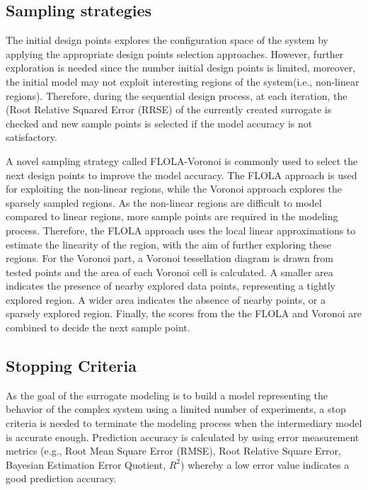  \subsection{Sampling strategies}
 
The initial design points explores the configuration space of the system by applying the appropriate design points selection approaches. However, further exploration is needed since the number initial design points is limited, moreover, the initial model may not exploit interesting regions of the system(i.e., non-linear regions).  Therefore, during the sequential design process, at each iteration, the (Root Relative Squared Error (RRSE)  of the currently created surrogate is checked and new sample points is selected if the model accuracy is not satisfactory. 
 
A novel sampling strategy called FLOLA-Voronoi \cite{vanderherten2015} is commonly used to select the next design points to improve the model accuracy.  The FLOLA approach is used for exploiting the non-linear regions, while the Voronoi approach explores the sparsely sampled regions. As the non-linear regions are difficult to model compared to linear regions, more sample points are required in the modeling process. Therefore, the FLOLA approach uses the local linear approximations to estimate the linearity of the region, with the aim of further exploring these regions. For the Voronoi part, a Voronoi tessellation diagram is drawn from tested points and  the area of each Voronoi cell is calculated. A smaller area indicates the presence of nearby explored data points, representing a tightly explored region. A wider area indicates the absence of nearby points, or a sparsely explored region.  Finally, the scores from the the FLOLA and Voronoi are combined to decide the next sample point.



\subsection{Stopping Criteria}

As the goal of the surrogate modeling is to build a model representing the behavior of the complex system using a limited number of experiments, a stop criteria is needed to terminate the modeling process when the intermediary model is accurate enough. Prediction accuracy is calculated by using error measurement metrics (e.g., Root Mean Square Error (RMSE), Root Relative Square Error, Bayesian Estimation Error Quotient, $R^2$) whereby a low error value indicates a good prediction accuracy. 


